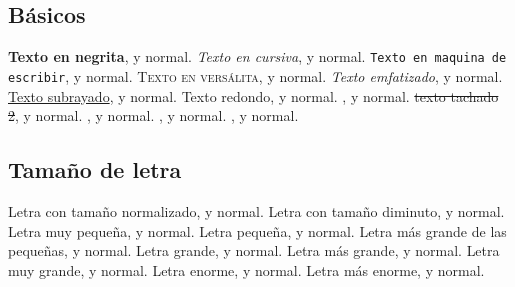 \documentclass{article}
\begin{document}
\subsection{Básicos}
\textbf{Texto en negrita}, y normal.
\newline
\newline
\textit{Texto en cursiva}, y normal.
\newline
\newline
\texttt{Texto en maquina de escribir}, y normal.
\newline
\newline
\textsc{Texto en versálita}, y normal.
\newline
\newline
\emph{Texto emfatizado}, y normal.
\newline
\newline
\underline{Texto subrayado}, y normal.
\newline
\newline
\textrm{Texto redondo}, y normal.
\newline
\newline
{}, y normal. %
\newline
\newline
\sout{texto tachado 2}, y normal. %
\newline
\newline
{}, y normal. %
\newline
\newline
{}, y normal. %
\newline
\newline
{}, y normal. %
\clearpage
\subsection{Tamaño de letra}
\normalsize{Letra con tamaño normalizado}, y normal.
\newline
\newline
{\tiny{Letra con tamaño diminuto}}, y normal.
\newline
\newline
{\scriptsize{Letra muy pequeña}}, y normal.
\newline
\newline
{\footnotesize{Letra pequeña}}, y normal.
\newline
\newline
{\small{Letra más grande de las pequeñas}}, y normal.
\newline
\newline
{\large{Letra grande}}, y normal.
\newline
\newline
{\Large{Letra más grande}}, y normal.
\newline
\newline
{\LARGE{Letra muy grande}}, y normal.
\newline
\newline
{\huge{Letra enorme}}, y normal.
\newline
\newline
{\Huge{Letra más enorme}}, y normal.
\end{document}
